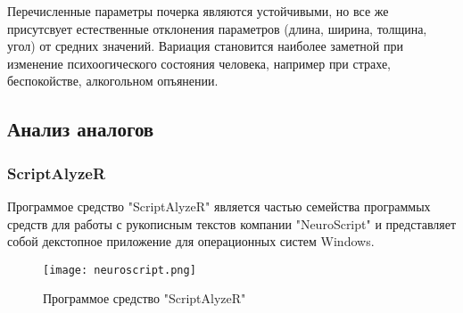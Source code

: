 Перечисленные параметры почерка являются устойчивыми, но все же присутсвует естественные отклонения параметров (длина, ширина, толщина, угол) от средних значений. Вариация становится наиболее заметной при изменение психоогического состояния человека, например при страхе, беспокойстве, алкогольном опъянении.

\subsection{Анализ аналогов}
\label{sub:domain:analogs}

\subsubsection{ScriptAlyzeR}
\label{sub:domain:analogs:neuro_script}

Программое средство "ScriptAlyzeR" является частью семейства программых средств для работы с рукописным текстов компании "NeuroScript" и представляет собой декстопное приложение для операционных систем Windows.

\begin{figure}[ht]
    \centering
    \label{fig:domain:analogs:neuro_script}
    \texttt{[image: neuroscript.png]}
    \caption{Программое средство "ScriptAlyzeR"}
\end{figure}

